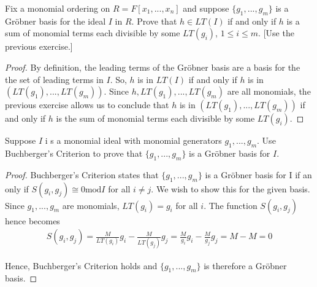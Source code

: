 \documentclass[10pt]{article}
\newenvironment{problem}[2][Problem]{\begin{trivlist}
		\item[\hskip \labelsep {\bfseries #1}\hskip \labelsep {\bfseries #2.}]}{\end{trivlist}}
\begin{document}
	\begin{problem}{6.11}
		Fix a monomial ordering on $R = F[x_1, ..., x_n]$ and suppose $\{g_1, ..., g_m\}$ is a Gr\"obner basis for the ideal $I$ in $R$. Prove that $h \in LT(I)$ if and only if $h$ is a sum of monomial terms each divisible by some $LT(g_i)$, $1 \leq i \leq m$. [Use the previous exercise.]
		\begin{proof}
			By definition, the leading terms of the Gr\"obner basis are a basis for the the set of leading terms in $I$. So, $h$ is in $LT(I)$ if and only if $h$ is in $(LT(g_1), ..., LT(g_m))$. Since $h, LT(g_1), ..., LT(g_m)$ are all monomials, the previous exercise allows us to conclude that $h$ is in $(LT(g_1), ..., LT(g_m))$ if and only if $h$ is the sum of monomial terms each divisible by some $LT(g_i)$.
		\end{proof}
	\end{problem}
	
	\begin{problem}{6.13}
		Suppose $I$ i s a monomial ideal with monomial generators $g_1, ..., g_m$. Use Buchberger's Criterion to prove that $\{g_1, ..., g_m\}$ is a Gr\"obner basis for $I$.
		\begin{proof}
			Buchberger's Criterion states that $\{g_1, ..., g_m\}$ is a Gr\"obner basis for I if an only if $S(g_i, g_j) \cong 0 \text{mod}I$ for all $i \not = j$. We wish to show this for the given basis.
			Since $g_1, ..., g_m$ are monomials, $LT(g_i)=g_i$ for all $i$. The function $S(g_i, g_j)$ hence becomes
			\begin{align*}
				S(g_i, g_j) = \frac{M}{LT(g_i)}g_i - \frac{M}{LT(g_j)}g_j = \frac{M}{g_i}g_i - \frac{M}{g_j}g_j = M - M = 0
			\end{align*}
			
			Hence, Buchberger's Criterion holds and $\{g_1, ..., g_m\}$ is therefore a Gr\"obner basis.
		\end{proof}
	\end{problem}
	
\end{document}
